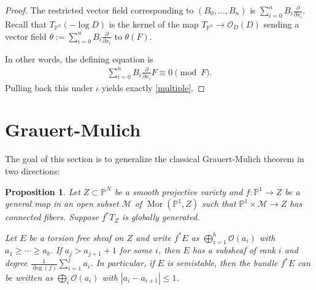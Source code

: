 \documentclass[11pt,reqno]{amsart}
\theoremstyle{plain}
\newtheorem{proposition}[theorem]{Proposition}
\theoremstyle{definition}
\theoremstyle{remark}
\numberwithin{equation}{section}
\newcommand{\cO}{{\mathscr O}}
\renewcommand{\to}{{\longrightarrow}}
\numberwithin{equation}{section}
\newcommand{\PP}{\mathbb{P}}
\newcommand{\cM}{\mathcal{M}}
\begin{document}
\begin{proof}
The restricted vector field corresponding to $(B_0,\ldots,B_{n})$ is $\sum_{i=0}^{n}B_i\frac{\partial}{\partial x_i}$. Recall that $T_{\mathbb{P}^n}(-\log D)$ is the kernel of the map $T_{\mathbb{P}^n}\to \mathscr{O}_D(D)$ sending a vector field $\theta:=\sum_{i=0}^{n}B_i\frac{\partial}{\partial x_i}$ to $\theta(F)$.

In other words, the defining equation is
\begin{align*}
    \sum_{i=0}^{n}B_i\frac{\partial}{\partial x_i}F \equiv 0 \pmod{F}.
\end{align*}
Pulling back this under $\iota$ yields exactly \eqref{multiple}.
\end{proof}

\section{Grauert-Mulich}
\label{sec:Grauert-Mulich}
The goal of this section is to generalize the classical Grauert-Mulich theorem \cite[Theorem 2.1.4]{OSS80} in two directions:

\begin{proposition}
\label{thm-GrauertMulich}
Let $Z\subset \mathbb{P}^N$ be a smooth projective variety and $f: \mathbb{P}^1\to Z$ be a general map in an open subset $\cM$ of $\operatorname{Mor}(\mathbb{P}^1, Z)$ such that $\PP^1\times \cM\to Z$ has connected fibers. Suppose $f^{*}T_Z$ is globally generated.

Let $E$ be a torsion free sheaf on $Z$ and write $f^{*}E$ as $\bigoplus_{i=1}^b \cO(a_i)$ with $a_1\geq \cdots \geq a_b$. If $a_j>a_{j+1}+1$ for some $i$, then $E$ has a subsheaf of rank $i$ and degree $\frac{1}{\deg(f)}\sum_{i=1}^ja_i$. In particular, if $E$ is semistable, then the bundle $f^{*}E$ can be written as $\bigoplus_i \cO(a_i)$ with $|a_i - a_{i+1}| \leq 1$.

\end{proposition}
\end{document}

